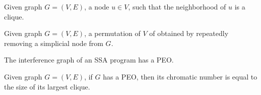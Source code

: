 
\begin{definition}
    Given graph $G = (V, E)$, a node $u \in V$, such that  the neighborhood of $u$ is a clique.
\end{definition}

\begin{definition}
    Given graph $G = (V, E)$, a permutation of $V$ of obtained by repeatedly removing a simplicial node from $G$.
\end{definition}

\begin{theorem}[]
    The interference graph of an SSA program has a PEO.
\end{theorem}

\begin{theorem}
    Given graph $G = (V, E)$, if $G$ has a PEO, then its chromatic number is equal to the size of its largest clique.
\end{theorem}